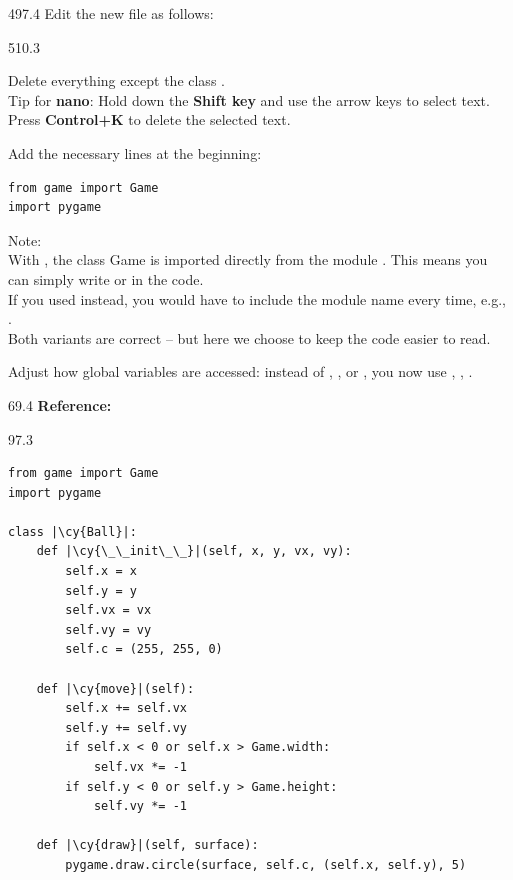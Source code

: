 \documentclass{aslab}
\newcommand*\codemd[1]{{\mdseries\codearg{#1}}}
\newcommand*\cy[1]{\textcolor{codecyan}{#1}}
\begin{document}
\begin{region}{497.4}
Edit the new file  as follows:
\end{region}

\begin{region}[pitch=13.55]{510.3}
\begin{dashlist}
\item Delete everything except the class .\\
  Tip for \textbf{nano}: Hold down the \textbf{Shift key} and use the arrow
  keys to select text.\\
  Press \textbf{Control+K} to delete the selected text.
\item Add the necessary  lines at the beginning:
\begin{lstlisting}[style=pyn]
from game import Game
import pygame
\end{lstlisting}
  Note:\\
  With , the class Game is imported directly from
  the module . This means you can simply write
   or  in the code.\\
  If you used  instead, you would have to include the module
  name every time, e.g., .\\
  Both variants are correct -- but here we choose
   to keep the code easier to read.
\item Adjust how global variables are accessed: instead of ,
  , or , you now use ,
  , .
\end{dashlist}
\end{region}

\nextpage
\begin{region}{69.4}
\textbf{Reference: \codemd{ball.py}}
\end{region}

\begin{region}{97.3}
\begin{lstlisting}[style=pyn]
from game import Game
import pygame

class |\cy{Ball}|:
    def |\cy{\_\_init\_\_}|(self, x, y, vx, vy):
        self.x = x
        self.y = y
        self.vx = vx
        self.vy = vy
        self.c = (255, 255, 0)

    def |\cy{move}|(self):
        self.x += self.vx
        self.y += self.vy
        if self.x < 0 or self.x > Game.width:
            self.vx *= -1
        if self.y < 0 or self.y > Game.height:
            self.vy *= -1

    def |\cy{draw}|(self, surface):
        pygame.draw.circle(surface, self.c, (self.x, self.y), 5)
\end{lstlisting}
\end{region}
\end{document}
